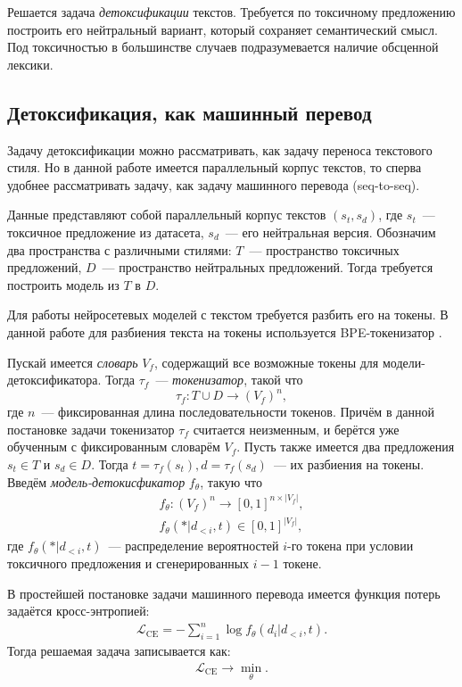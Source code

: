 Решается задача \textit{детоксификации} текстов.
Требуется по токсичному предложению построить его нейтральный вариант, который сохраняет семантический смысл.  
Под токсичностью в большинстве случаев подразумевается наличие обсценной лексики.

\subsection{Детоксификация, как машинный перевод}
\label{section:machine_translation}
Задачу детоксификации можно рассматривать, как задачу переноса текстового стиля. 
Но в данной работе имеется параллельный корпус текстов, то сперва удобнее рассматривать задачу, как задачу машинного перевода (seq-to-seq). 

Данные представляют собой параллельный корпус текстов $(s_t, s_d)$, где $s_t$~--- токсичное предложение из датасета, $s_d$~--- его нейтральная версия. 
Обозначим два пространства с различными стилями: $T$~--- пространство токсичных предложений, $D$~--- пространство нейтральных предложений.
Тогда требуется построить модель из $T$ в $D$.

Для работы нейросетевых моделей с текстом требуется разбить его на токены. 
В данной работе для разбиения текста на токены используется BPE-токенизатор \cite{bpe}. 

Пускай имеется \textit{словарь} $V_f$, содержащий все возможные токены для модели-детоксификатора.
Тогда $\tau_f$~--- \textit{токенизатор}, такой что $$\tau_f: T \cup D \to \left(V_f\right)^{n},$$ где $n$~--- фиксированная длина последовательности токенов.  
Причём в данной постановке задачи токенизатор  $\tau_{f}$ считается неизменным, и берётся уже обученным с фиксированным словарём $V_{f}$. 
Пусть также имеется два предложения $s_t \in T$ и $s_d \in D$.
Тогда $t = \tau_{f}(s_t), d = \tau_{f}(s_d)$~--- их разбиения на токены.
Введём \textit{модель-детокисфикатор} $f_{\theta}$, такую что 
\begin{gather*}
    f_{\theta}: \left(V_f\right)^{n} \to [0, 1]^{n \times |V_f|}, \\
    f_{\theta}(* | d_{<i}, t) \in [0, 1]^{|V_f|},
\end{gather*}
где $f_{\theta}(* | d_{<i}, t)$~--- распределение вероятностей $i$-го токена при условии токсичного предложения и сгенерированных $i-1$ токене.

В простейшей постановке задачи машинного перевода имеется функция потерь задаётся кросс-энтропией:
\begin{gather*}
    \mathcal{L}_{\text{CE}} = -\sum_{i=1}^{n} \log f_\theta(d_{i} | d_{<i}, t).
\end{gather*}
Тогда решаемая задача записывается как:
\begin{gather*}
    \mathcal{L}_{\text{CE}} \longrightarrow \min_{\theta}.
\end{gather*}


